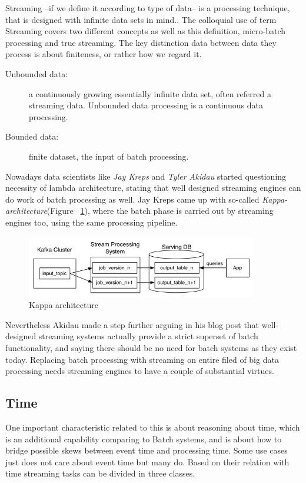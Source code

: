 Streaming --if we define it according to type of data-- is a processing technique, that is designed with infinite data sets in mind.\cite{101}. The colloquial use of term Streaming covers two different concepts as well as this definition, micro-batch processing and true streaming.
The key distinction data between data they process is about finiteness, or rather how we regard it.
\begin{description}
\item[Unbounded data:] a continuously growing essentially infinite data set, often referred a streaming data. Unbounded data processing is a continuous data processing.
\item[Bounded data:]finite dataset, the input of batch processing.
\end{description}
Nowadays data scientists like \textit{Jay Kreps} and \textit{Tyler Akidau} started questioning necessity of lambda architecture, stating that well designed streaming engines can do work of batch processing as well.  Jay Kreps came up with so-called \textit {Kappa- architecture}(Figure  ~\ref{fig:kappa}), where the batch phase is carried out by streaming engines too, using the same processing pipeline.
\begin{figure}[!ht]
  \centering    
      \includegraphics[width=0.9\textwidth]{figures/kappa-architecture.png}
  \caption{Kappa architecture \cite{beatCAP}}
  \label{fig:kappa}
\end{figure}
Nevertheless Akidau made a step further arguing in his blog post that well-designed streaming systems actually provide a strict superset of batch functionality, and saying there should be no need for batch systems as they exist today.
Replacing batch processing with streaming on entire filed of big data processing needs streaming engines to have a couple of substantial virtues. 

\subsection{Time }
One important characteristic related to this is about reasoning about time, which is an additional capability comparing to Batch systems, and is about how to bridge possible skews between event time and processing time. Some use cases just does not care about event time but many do. Based on their relation with time streaming tasks can be divided in three classes.


